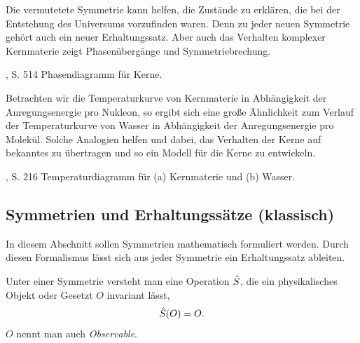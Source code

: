 Die vermutetete Symmetrie kann helfen, die Zustände zu
erklären, die bei der Entstehung des Universums vorzufinden waren. Denn zu
jeder neuen Symmetrie gehört auch ein neuer Erhaltungssatz. Aber auch das
Verhalten komplexer Kernmaterie zeigt Phasenübergänge und Symmetriebrechung. 

%
	{\FrauenfelderHenley, S. 514}%
	{Phasendiagramm für Kerne.}


\begin{bspn}
Betrachten wir die Temperaturkurve von Kernmaterie in Abhängigkeit der
Anregungsenergie pro Nukleon, so ergibt sich eine große Ähnlichkeit zum Verlauf der Temperaturkurve von
Wasser in Abhängigkeit der Anregungsenergie pro Molekül. Solche Analogien
helfen und dabei, das Verhalten der Kerne auf bekanntes zu übertragen und so
ein Modell für die Kerne zu entwickeln.\bsphere
\end{bspn}

%
	{\BethgeWalter, S. 216}%
	{Temperaturdiagramm für (a) Kernmaterie und (b) Wasser.}

\subsection{Symmetrien und Erhaltungssätze (klassisch)}

In diesem Abschnitt sollen Symmetrien mathematisch formuliert werden. Durch
diesen Formalismus lässt sich aus jeder Symmetrie ein Erhaltungssatz ableiten.

Unter einer Symmetrie versteht man eine Operation $\hat{\boldmath{S}}$, die ein
physikalisches Objekt oder Gesetzt $O$ invariant lässt,
\begin{align*}
\hat{\boldmath{S}}(O) = O.
\end{align*}
$O$ nennt man auch \emph{Observable}.

